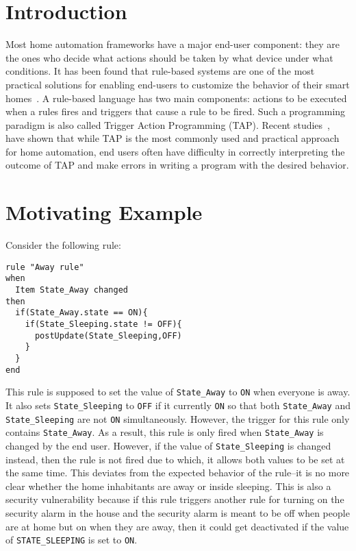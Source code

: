 \documentclass{sig-alternate-05-2015}
\newcommand\todo[1]{\textbf{\textcolor{red}{#1}}}
\begin{document}
\maketitle
\begin{abstract}
[\todo {Write abstract}]
\end{abstract}

\printccsdesc



\section{Introduction}
Most home automation frameworks have a major end-user component: they are the ones who decide what actions should be taken by what device under what conditions. It has been found that rule-based systems are one of the most practical solutions for enabling end-users to customize the behavior of their smart homes~\cite{practical-tap}. A rule-based language has two main components: actions to be executed when a rules fires and triggers that cause a rule to be fired. Such a programming paradigm is also called Trigger Action Programming (TAP). Recent studies~\cite{Huang},\cite{wild-tap} have shown that while TAP is the most commonly used and practical approach for home automation, end users often have difficulty in correctly interpreting the outcome of TAP and make errors in writing a program with the desired behavior. 

\section{Motivating Example}
Consider the following rule:
\begin{lstlisting}
rule "Away rule"
when
  Item State_Away changed 	
then
  if(State_Away.state == ON){
    if(State_Sleeping.state != OFF){
      postUpdate(State_Sleeping,OFF)
    }
  }
end
\end{lstlisting}
This rule is supposed to set the value of \texttt{State\_Away} to \texttt{ON} when everyone is away. It also sets \texttt{State\_Sleeping} to \texttt{OFF} if it currently \texttt{ON} so that both \texttt{State\_Away} and \texttt{State\_Sleeping} are not \texttt{ON} simultaneously. However, the trigger for this rule only contains \texttt{State\_Away}. As a result, this rule is only fired when \texttt{State\_Away} is changed by the end user. However, if the value of \texttt{State\_Sleeping} is changed instead, then the rule is not fired due to which, it allows both values to be set at the same time. This deviates from the expected behavior of the rule--it is no more clear whether the home inhabitants are away or inside sleeping. This is also a security vulnerability because if this rule triggers another rule for turning on the security alarm in the house and the security alarm is meant to be off when people are at home but on when they are away, then it could get deactivated if the value of \texttt{STATE\_SLEEPING} is set to \texttt{ON}. 
\end{document}
